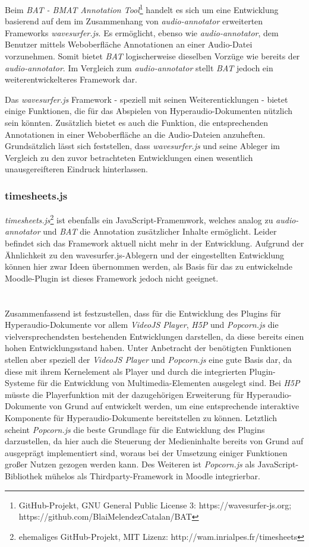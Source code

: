 Beim \textit{BAT - BMAT Annotation Tool}\footnote{GitHub-Projekt, GNU General Public License 3: https://wavesurfer-js.org; https://github.com/BlaiMelendezCatalan/BAT} handelt es sich um eine Entwicklung basierend auf dem im Zusammenhang von \textit{audio-annotator} erweiterten Frameworks \textit{wavesurfer.js}. Es ermöglicht, ebenso wie \textit{audio-annotator}, dem Benutzer mittels Weboberfläche Annotationen an einer Audio-Datei vorzunehmen. Somit bietet \textit{BAT} logischerweise dieselben Vorzüge wie bereits der \textit{audio-annotator}. Im Vergleich zum \textit{audio-annotator} stellt \textit{BAT} jedoch ein weiterentwickelteres Framework dar.

Das \textit{wavesurfer.js} Framework - speziell mit seinen Weiterenticklungen - bietet einige Funktionen, die für das Abspielen von Hyperaudio-Dokumenten nützlich sein könnten. Zusätzlich bietet es auch die Funktion,  die entsprechenden Annotationen in einer Weboberfläche an die Audio-Dateien anzuheften. Grundsätzlich lässt sich feststellen, dass \textit{wavesurfer.js} und seine Ableger im Vergleich zu den zuvor betrachteten Entwicklungen einen wesentlich unausgereifteren Eindruck hinterlassen.

\subsubsection{timesheets.js}
\textit{timesheets.js}\footnote{ehemaliges GitHub-Projekt, MIT Lizenz: http://wam.inrialpes.fr/timesheets} ist ebenfalls ein JavaScript-Framemwork, welches analog zu \textit{audio-annotator} und \textit{BAT} die Annotation zusätzlicher Inhalte ermöglicht. Leider befindet sich das Framework aktuell nicht mehr in der Entwicklung. Aufgrund der Ähnlichkeit zu den {wavesurfer.js}-Ablegern und der eingestellten Entwicklung können hier zwar Ideen übernommen werden, als Basis für das zu entwickelnde Moodle-Plugin ist dieses Framework jedoch nicht geeignet.
\\\\\\
Zusammenfassend ist festzustellen, dass für die Entwicklung des Plugins für Hyperaudio-Dokumente vor allem \textit{VideoJS Player}, \textit{H5P} und \textit{Popcorn.js} die vielversprechendsten bestehenden Entwicklungen darstellen, da diese bereits einen hohen Entwicklungsstand haben. Unter Anbetracht der benötigten Funktionen stellen aber speziell der \textit{VideoJS Player} und \textit{Popcorn.js} eine gute Basis dar, da diese mit ihrem Kernelement als Player und durch die integrierten Plugin-Systeme für die Entwicklung von Multimedia-Elementen ausgelegt sind. Bei \textit{H5P} müsste die Playerfunktion mit der dazugehörigen Erweiterung für Hyperaudio-Dokumente von Grund auf entwickelt werden, um eine entsprechende interaktive Komponente für Hyperaudio-Dokumente bereitstellen zu können. Letztlich scheint \textit{Popcorn.js} die beste Grundlage für die Entwicklung des Plugins darzustellen, da hier auch die Steuerung der Medieninhalte bereits von Grund auf ausgeprägt implementiert sind, woraus bei der Umsetzung einiger Funktionen großer Nutzen gezogen werden kann. Des Weiteren ist \textit{Popcorn.js} als JavaScript-Bibliothek mühelos als Thirdparty-Framework in Moodle integrierbar.


